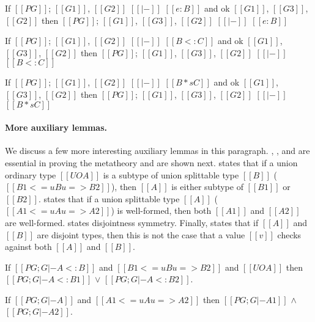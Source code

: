 \begin{lemma}\label{lemma:typ:rev:poly:weak}
  If $[[PG]]$; $[[G1]]$, $[[G2]]$ $[[|-]]$ $[[e : B]]$ and ok $[[G1]]$, $[[G3]]$, $[[G2]]$
  then $[[PG]]$; $[[G1]]$, $[[G3]]$, $[[G2]]$ $[[|-]]$ $[[e : B]]$
\end{lemma}

\begin{lemma}\label{lemma:sub:rev:poly:weak}
  If $[[PG]]$; $[[G1]]$, $[[G2]]$ $[[|-]]$ $[[B <: C]]$ and ok $[[G1]]$, $[[G3]]$, $[[G2]]$
  then $[[PG]]$; $[[G1]]$, $[[G3]]$, $[[G2]]$ $[[|-]]$ $[[B <: C]]$
\end{lemma}

\begin{lemma}\label{lemma:disj:rev:poly:weak}
  If $[[PG]]$; $[[G1]]$, $[[G2]]$ $[[|-]]$ $[[B *s C]]$ and ok $[[G1]]$, $[[G3]]$, $[[G2]]$
  then $[[PG]]$; $[[G1]]$, $[[G3]]$, $[[G2]]$ $[[|-]]$ $[[B *s C]]$
\end{lemma}

\paragraph{More auxiliary lemmas.}
We discuss a few more interesting auxiliary lemmas in this paragraph.
, ,
 and 
are essential in proving the metatheory and are shown next.
 states that if a
union ordinary type $[[UO A]]$ is a subtype of union splittable
type $[[B]]$ ($[[B1 <=u B u=> B2]]$), then $[[A]]$ is either subtype of
$[[B1]]$ or $[[B2]]$.
 states that if a union splittable type
$[[A]]$ ($[[A1 <=u A u=> A2]]$) is well-formed, then both
$[[A1]]$ and $[[A2]]$ are well-formed.
 states disjointness symmetry.
Finally,  states that
if $[[A]]$ and $[[B]]$ are disjoint types, then this is not the case
that a value $[[v]]$ checks against both $[[A]]$ and $[[B]]$. 


\begin{lemma}\label{lemma:rev:poly:uo:usp:sub}
  If $[[PG ; G |- A <: B]]$ and $[[B1 <=u B u=> B2]]$ and $[[UO A]]$
  then $[[PG ; G |- A <: B1]]$ $\vee$ $[[PG ; G |- A <: B2]]$.
\end{lemma}

\begin{lemma}\label{lemma:rev:poly:wft:usp}
  If $[[PG ; G |- A]]$ and $[[A1 <=u A u=> A2]]$
  then $[[PG ; G |- A1]]$ $\wedge$ $[[PG ; G |- A2]]$.
\end{lemma}

